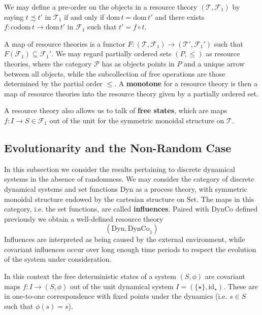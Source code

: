 We may define a pre-order on the objects in a resource theory $(\mathcal{T},\mathcal{F}_1)$ by saying $t \precsim t'$ in $\mathcal{T}_1$ if and only if $\text{dom}\,t = \text{dom}\,t'$ and there exists $f:\text{codom}\, t \rightarrow \text{dom}\,t'$ in $\mathcal{F}_1$ such that $t' = f\circ t$.

A map of resource theories is a functor $F:(\mathcal{T},\mathcal{F}_1)\rightarrow (\mathcal{T}',\mathcal{F}_1')$ such that $F(\mathcal{F}_1) \subseteq \mathcal{F}_1'$. We may regard partially ordered sets $(P,\leq)$ as resource theories, where the category $\mathcal{P}$ has as objects points in $P$ and a unique arrow between all objects, while the subcollection of free operations are those determined by the partial order $\leq$. A \textbf{monotone} for a resource theory is then a map of resource theories into the resource theory given by a partially ordered set.


A resource theory also allows us to talk of \textbf{free states}, which are maps $f:I\rightarrow S \in \mathcal{F}_1$ out of the unit for the symmetric monoidal structure on $\mathcal{T}$. 


\subsection{Evolutionarity and the Non-Random Case}

In this subsection we consider the results pertaining to discrete dynamical systems in the absence of randomness. We may consider the category of discrete dynamical systems and set functions $\text{Dyn}$ as a process theory, with symmetric monoidal structure endowed by the cartesian structure on $\text{Set}$. The maps in this category, i.e. the set functions, are called \textbf{influences}. Paired with $\text{DynCo}$ defined previously we obtain a well-defined resource theory
\begin{equation}
    (\text{Dyn},\text{DynCo}_1)
\end{equation}
Influences are interpreted as being caused by the external environment, while covariant influences occur over long enough time periods to respect the evolution of the system under consideration. 


In this context the free deterministic states of a system $(S,\phi)$ are covariant maps $f:I\rightarrow (S,\phi)$ out of the unit dynamical system $I =(\{\star\},\text{id}_{\star})$. These are in one-to-one correspondence with fixed points under the dynamics (i.e. $s \in S$ such that $\phi(s) = s$). 

